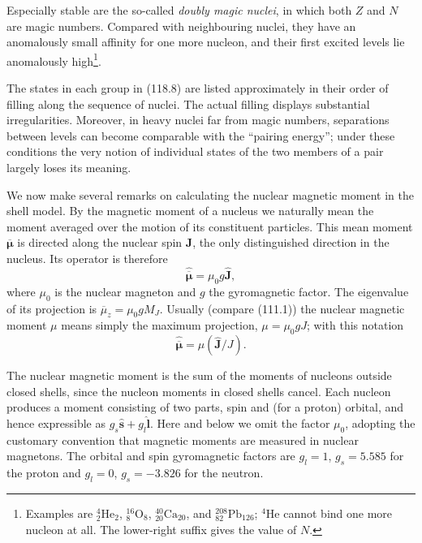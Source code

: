Especially stable are the so-called \emph{doubly magic nuclei}, in which both
$Z$ and $N$ are magic numbers. Compared with neighbouring nuclei, they have
an anomalously small affinity for one more nucleon, and their first excited
levels lie anomalously high\footnote{Examples are
${}^{4}_{2}\mathrm{He}_{2}$, ${}^{16}_{8}\mathrm{O}_{8}$,
${}^{40}_{20}\mathrm{Ca}_{20}$, and ${}^{208}_{82}\mathrm{Pb}_{126}$;
${}^{4}\mathrm{He}$ cannot bind one more nucleon at all. The lower-right
suffix gives the value of $N$.}.

The states in each group in (118.8) are listed approximately in their order of
filling along the sequence of nuclei. The actual filling displays substantial
irregularities. Moreover, in heavy nuclei far from magic numbers, separations
between levels can become comparable with the ``pairing energy''; under these
conditions the very notion of individual states of the two members of a pair
largely loses its meaning.

We now make several remarks on calculating the nuclear magnetic moment in the
shell model. By the magnetic moment of a nucleus we naturally mean the moment
averaged over the motion of its constituent particles. This mean moment
$\overline{\boldsymbol\mu}$ is directed along the nuclear spin $\mathbf J$,
the only distinguished direction in the nucleus. Its operator is therefore
\begin{equation}
 \hat{\overline{\boldsymbol\mu}}=\mu_0g\hat{\mathbf J},
 \tag{118.9}
\end{equation}
where $\mu_0$ is the nuclear magneton and $g$ the gyromagnetic factor. The
eigenvalue of its projection is $\overline\mu_z=\mu_0gM_J$. Usually (compare
(111.1)) the nuclear magnetic moment $\mu$ means simply the maximum projection,
$\mu=\mu_0gJ$; with this notation
\begin{equation}
 \hat{\overline{\boldsymbol\mu}}=\mu(\hat{\mathbf J}/J).
 \tag{118.10}
\end{equation}

The nuclear magnetic moment is the sum of the moments of nucleons outside
closed shells, since the nucleon moments in closed shells cancel. Each nucleon
produces a moment consisting of two parts, spin and (for a proton) orbital,
and hence expressible as $g_s\hat{\mathbf s}+g_l\hat{\mathbf l}$. Here and
below we omit the factor $\mu_0$, adopting the customary convention that
magnetic moments are measured in nuclear magnetons. The orbital and spin
gyromagnetic factors are $g_l=1$, $g_s=5{.}585$ for the proton and $g_l=0$,
$g_s=-3{.}826$ for the neutron.

